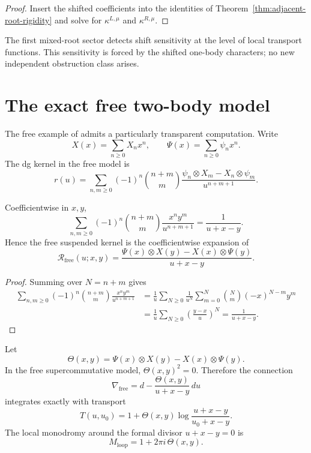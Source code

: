 \begin{proof}
Insert the shifted coefficients into the identities of
Theorem~\ref{thm:adjacent-root-rigidity} and solve for
$\kappa^{L,\mu}$ and $\kappa^{R,\mu}$.
\end{proof}

\begin{interpretation}
The first mixed-root sector detects shift sensitivity at the level of
local transport functions. This sensitivity is forced by the shifted
one-body characters; no new independent obstruction class arises.
\end{interpretation}

\section{The exact free two-body model}

The free example of \cite{DNP25} admits a particularly transparent
computation. Write
\[
X(x)=\sum_{n\ge 0} X_n x^n,
\qquad
\Psi(x)=\sum_{n\ge 0} \psi_n x^n.
\]
The dg kernel in the free model is
\[
r(u)=\sum_{n,m\ge 0}(-1)^n\binom{n+m}{m}
\frac{\psi_n\otimes X_m-X_n\otimes \psi_m}{u^{n+m+1}}.
\]

\begin{lemma}
\label{lem:free-closed-generating-kernel}
Coefficientwise in $x,y$,
\[
\sum_{n,m\ge 0}(-1)^n\binom{n+m}{m}\frac{x^n y^m}{u^{n+m+1}}
=
\frac{1}{u+x-y}.
\]
Hence the free suspended kernel is the coefficientwise expansion of
\[
\mathcal R_{\mathrm{free}}(u;x,y)=
\frac{\Psi(x)\otimes X(y)-X(x)\otimes \Psi(y)}{u+x-y}.
\]
\end{lemma}

\begin{proof}
Summing over $N=n+m$ gives
\begin{align*}
\sum_{n,m\ge 0}(-1)^n\binom{n+m}{m}\frac{x^n y^m}{u^{n+m+1}}
&=
\frac1u\sum_{N\ge 0}\frac1{u^N}
\sum_{m=0}^N \binom{N}{m}(-x)^{N-m}y^m\\
&=
\frac1u\sum_{N\ge 0}\left(\frac{y-x}{u}\right)^N
=
\frac{1}{u+x-y}.
\end{align*}
\end{proof}

\begin{theorem}
\label{thm:exact-free-transport}
Let
\[
\Theta(x,y)=\Psi(x)\otimes X(y)-X(x)\otimes \Psi(y).
\]
In the free supercommutative model, $\Theta(x,y)^2=0$. Therefore the
connection
\[
\nabla_{\mathrm{free}}=d-
\frac{\Theta(x,y)}{u+x-y}\,du
\]
integrates exactly with transport
\[
T(u,u_0)=1+\Theta(x,y)\log\!\frac{u+x-y}{u_0+x-y}.
\]
The local monodromy around the formal divisor $u+x-y=0$ is
\[
M_{\mathrm{loop}}=1+2\pi i\,\Theta(x,y).
\]
\end{theorem}

